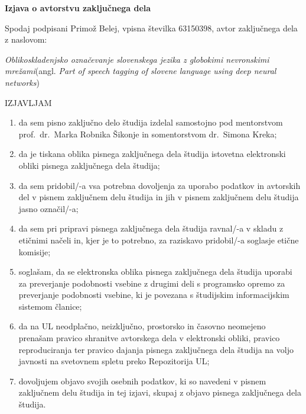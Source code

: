 \documentclass[a4paper, 12pt]{book}
\begin{document}

\pagestyle{empty}
\begin{center}
{\Large\textbf{\sc Izjava o avtorstvu zaključnega dela}}
\end{center}
%
\noindent Spodaj podpisani Primož Belej, vpisna številka 63150398, avtor zaključnega dela z naslovom:

\noindent\emph{Oblikoskladenjsko označevanje slovenskega jezika z globokimi nevronskimi mrežami}\hspace{5mm}(angl. \emph{Part of speech tagging of slovene language using deep neural networks})

\begin{center}IZJAVLJAM\end{center}
\begin{enumerate}
\setlength\itemsep{0mm}
\item da sem pisno zaključno delo študija izdelal samostojno pod mentorstvom prof.\ dr.\ Marka Robnika Šikonje in somentorstvom dr.\ Simona Kreka;
\item da je tiskana oblika pisnega zaključnega dela študija istovetna elektronski obliki pisnega zaključnega dela študija;
\item da sem pridobil/-a vsa potrebna dovoljenja za uporabo podatkov in avtorskih del v pisnem zaključnem delu študija in jih v pisnem zaključnem delu študija jasno označil/-a;
\item da sem pri pripravi pisnega zaključnega dela študija ravnal/-a v skladu z etičnimi načeli in, kjer je to potrebno, za raziskavo pridobil/-a soglasje etične komisije;
\item soglašam, da se elektronska oblika pisnega zaključnega dela študija uporabi za preverjanje podobnosti vsebine z drugimi deli s programsko opremo za preverjanje podobnosti vsebine, ki je povezana s študijskim informacijskim sistemom članice;
\item da na UL neodplačno, neizključno, prostorsko in časovno neomejeno prenašam pravico shranitve avtorskega dela v elektronski obliki, pravico reproduciranja ter pravico dajanja pisnega zaključnega dela študija na voljo javnosti na svetovnem spletu preko Repozitorija UL;
\item dovoljujem objavo svojih osebnih podatkov, ki so navedeni v pisnem zaključnem delu študija in tej izjavi, skupaj z objavo pisnega zaključnega dela študija.
\end{enumerate}
\end{document}
